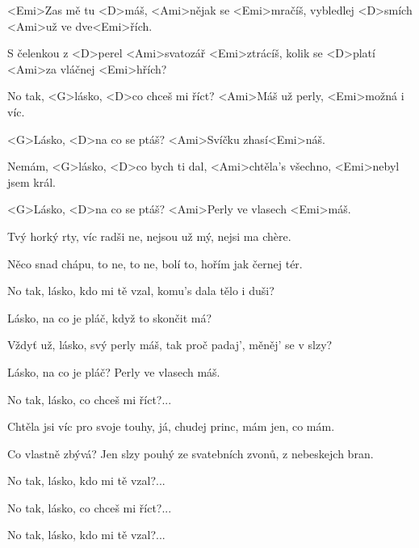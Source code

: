 

\zs
<Emi>Zas mě tu <D>máš, <Ami>nějak se <Emi>mračíš,
vybledlej <D>smích <Ami>už ve dve<Emi>řích.

S čelenkou z <D>perel <Ami>svatozář <Emi>ztrácíš,
kolik se <D>platí <Ami>za vláčnej <Emi>hřích?
\ks

\zr
No tak, <G>lásko, <D>co chceš mi říct?
<Ami>Máš už perly, <Emi>možná i víc.

<G>Lásko, <D>na co se ptáš? <Ami>Svíčku zhasí<Emi>náš.

Nemám, <G>lásko, <D>co bych ti dal,
<Ami>chtěla's všechno, <Emi>nebyl jsem král.

<G>Lásko, <D>na co se ptáš? <Ami>Perly ve vlasech <Emi>máš.
\kr

\zs
Tvý horký rty, víc radši ne,
nejsou už mý, nejsi ma chère.

Něco snad chápu, to ne, to ne,
bolí to, hořím jak černej tér.
\ks

\zr
No tak, lásko, kdo mi tě vzal,
komu's dala tělo i duši?

Lásko, na co je pláč,
když to skončit má?

Vždyť už, lásko, svý perly máš,
tak proč padaj', měněj' se v slzy?

Lásko, na co je pláč?
Perly ve vlasech máš.
\kr

\zr No tak, lásko, co chceš mi říct?... \kr

\zs
Chtěla jsi víc pro svoje touhy,
já, chudej princ, mám jen, co mám.

Co vlastně zbývá? Jen slzy pouhý
ze svatebních zvonů, z nebeskejch bran.
\ks

\zr No tak, lásko, kdo mi tě vzal?... \kr

\zr No tak, lásko, co chceš mi říct?... \kr

\zr No tak, lásko, kdo mi tě vzal?... \kr

\kp
